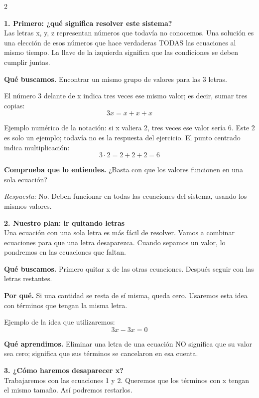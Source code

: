 \documentclass[11pt,a4paper,landscape]{article}
\begin{document}
\begin{multicols*}{2}
\noindent\begin{minipage}{\linewidth}\textbf{1. Primero: ¿qué significa resolver este sistema?}\\[2pt]Las letras x, y, z representan números que todavía no conocemos. Una solución es una elección de esos números que hace verdaderas TODAS las ecuaciones al mismo tiempo. La llave de la izquierda significa que las condiciones se deben cumplir juntas.
\par\smallskip\textbf{Qué buscamos.} Encontrar un mismo grupo de valores para las 3 letras.
\par\smallskip El número 3 delante de x indica tres veces ese mismo valor; es decir, sumar tres copias:
\[3x=x+x+x\]
\par\smallskip Ejemplo numérico de la notación: si x valiera 2, tres veces ese valor sería 6. Este 2 es solo un ejemplo; todavía no es la respuesta del ejercicio. El punto centrado indica multiplicación:
\[3\cdot 2=2+2+2=6\]
\par\smallskip\textbf{Comprueba que lo entiendes.} ¿Basta con que los valores funcionen en una sola ecuación?\par\textit{Respuesta:} No. Deben funcionar en todas las ecuaciones del sistema, usando los mismos valores.
\end{minipage}\par\medskip
\noindent\begin{minipage}{\linewidth}\textbf{2. Nuestro plan: ir quitando letras}\\[2pt]Una ecuación con una sola letra es más fácil de resolver. Vamos a combinar ecuaciones para que una letra desaparezca. Cuando sepamos un valor, lo pondremos en las ecuaciones que faltan.
\par\smallskip\textbf{Qué buscamos.} Primero quitar x de las otras ecuaciones. Después seguir con las letras restantes.
\par\smallskip\textbf{Por qué.} Si una cantidad se resta de sí misma, queda cero. Usaremos esta idea con términos que tengan la misma letra.
\par\smallskip Ejemplo de la idea que utilizaremos:
\[3x-3x=0\]
\par\smallskip\textbf{Qué aprendimos.} Eliminar una letra de una ecuación NO significa que su valor sea cero; significa que sus términos se cancelaron en esa cuenta.
\end{minipage}\par\medskip
\noindent\begin{minipage}{\linewidth}\textbf{3. ¿Cómo haremos desaparecer x?}\\[2pt]Trabajaremos con las ecuaciones 1 y 2. Queremos que los términos con x tengan el mismo tamaño. Así podremos restarlos.

\end{minipage}
\end{multicols*}
\end{document}
